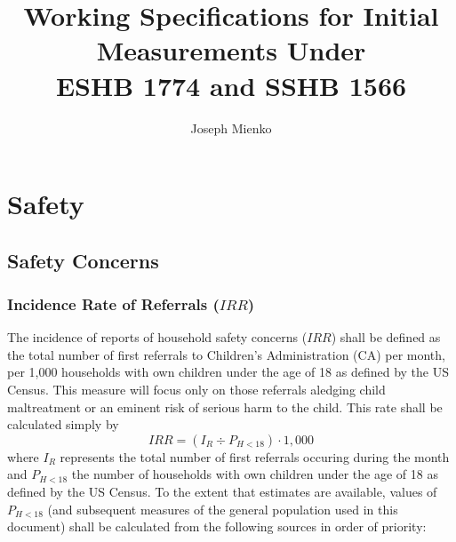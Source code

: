 \documentclass[12pt]{article}\usepackage[]{graphicx}\usepackage[]{color}
\title{Working Specifications for Initial Measurements Under \\
      ESHB 1774 and SSHB 1566}
\author{Joseph Mienko\inst{1}}
\begin{document}

 

        


   
\maketitle

\section{Safety}
\subsection{Safety Concerns}
\subsubsection{Incidence Rate of Referrals ($IRR$)}

The incidence of reports of household safety concerns ($IRR$) shall be defined as the total number of first referrals to Children's Administration (CA) per month, per 1,000 households with own children under the age of 18 as defined by the US Census. This measure will focus only on those referrals aledging child maltreatment or an eminent risk of serious harm to the child. This rate shall be calculated simply by 
\begin{equation}\label{eq:IRR}
IRR = (I_R \div P_{H<18}) \cdot 1,000
\end{equation}
where $I_R$ represents the total number of first referrals occuring during the month and $P_{H<18}$ the number of households with own children under the age of 18 as defined by the US Census. To the extent that estimates are available, values of $P_{H<18}$ (and subsequent measures of the general population used in this document) shall be calculated from the following sources in order of priority:
\end{document}
